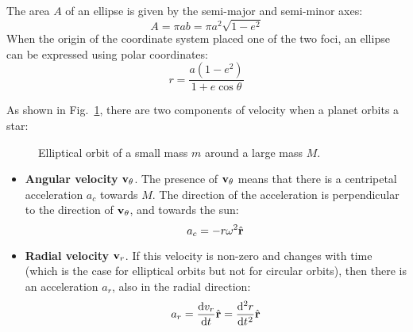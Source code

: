 \documentclass{../../../oss-handout}
\newcommand{\mb}[1]{\ensuremath\mathbf{#1}}
\begin{document}
The area $A$ of an ellipse is given by the semi-major and semi-minor axes:
\begin{equation}
  A=\pi ab=\pi a^2\sqrt{1-e^2}
  \label{A2}
\end{equation}
When the origin of the coordinate system placed one of the two foci, an ellipse
can be expressed using polar coordinates:
\begin{equation}
  r=\frac{a(1-e^2)}{1+e\cos\theta}
  \label{ellipse-eq}
\end{equation}

As shown in Fig.~\ref{eorbit}, there are two components of velocity when a
planet orbits a star:
\begin{figure}[!ht]
  \centering
  \caption{Elliptical orbit of a small mass $m$ around a large mass $M$.}
  \label{eorbit}
\end{figure}
\begin{itemize}
\item\textbf{Angular velocity} $\mb{v}_\theta$. The presence of $\mb{v}_\theta$
  means that there is a centripetal acceleration $a_c$ towards $M$. The
  direction of the acceleration is perpendicular to the direction of
  $\mb{v}_\theta$, and towards the sun:
  \begin{equation}
    a_c=-r\omega^2\hat{\mb{r}}
  \end{equation}
\item\textbf{Radial velocity} $\mb{v}_r$. If this velocity is non-zero and
  changes with time (which is the case for elliptical orbits but not for
  circular orbits), then there is an acceleration $a_r$, also in the radial
  direction:
  \begin{equation}
    a_r=\diff{v_r}t\hat{\mb{r}}=\diff[2]rt\hat{\mb{r}}
  \end{equation}
\end{itemize}
\end{document}
